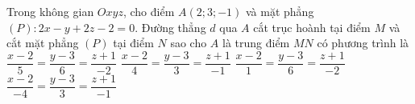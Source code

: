 %
\begin{ex}%
	Trong không gian $ Oxyz$, cho điểm $ A\left(2;3;-1\right)$ và mặt phẳng $(P)\colon 2x-y+2z-2=0$.
	Đường thẳng $ d$ qua $A$ cắt trục hoành tại điểm $ M$ và cắt mặt phẳng $(P)$ tại điểm $ N$ sao cho $ A$ là trung điểm $ MN$ có phương trình là
	\choice
	{$\dfrac{x-2}{5}=\dfrac{y-3}{6}=\dfrac{z+1}{-2}$}
	{\True $\dfrac{x-2}{4}=\dfrac{y-3}{3}=\dfrac{z+1}{-1}$}
	{$\dfrac{x-2}{1}=\dfrac{y-3}{6}=\dfrac{z+1}{-2}$}
	{$\dfrac{x-2}{-4}=\dfrac{y-3}{3}=\dfrac{z+1}{-1}$}
\end{ex}
%

